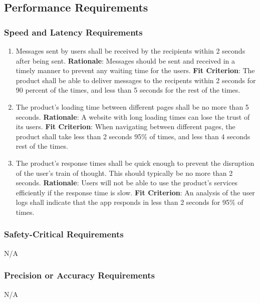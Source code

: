 \documentclass[12pt]{article}
\begin{document}
\subsection{Performance Requirements}
\subsubsection{Speed and Latency Requirements}
\begin{enumerate}[nfr]
    \item Messages sent by users shall be received by the recipients within 2 seconds after being sent.
    \newline \textbf{Rationale}: Messages should be sent and received in a timely manner to prevent any waiting time for the users.
    \newline \textbf{Fit Criterion}: The product shall be able to deliver messages to the recipents within 2 seconds for 90 percent of the times, and less than 5 seconds for the rest of the times. 

    \item The product's loading time between different pages shall be no more than 5 seconds.
    \newline \textbf{Rationale}: A website with long loading times can lose the trust of its users.
    \newline \textbf{Fit Criterion}: When navigating between different pages, the product shall take less than 2 seconds 95\% of times, and less than 4 seconds rest of the times. 

    \item The product's response times shall be quick enough to prevent the disruption of the user's train of thought. This should typically be no more than 2 seconds. 
    \newline \textbf{Rationale}: Users will not be able to use the product's services efficiently if the response time is slow.
    \newline \textbf{Fit Criterion}: An analysis of the user logs shall indicate that the app responds in less than 2 seconds for 95\% of times.
\end{enumerate}

\subsubsection{Safety-Critical Requirements}
N/A
\subsubsection{Precision or Accuracy Requirements}
N/A
\end{document}
